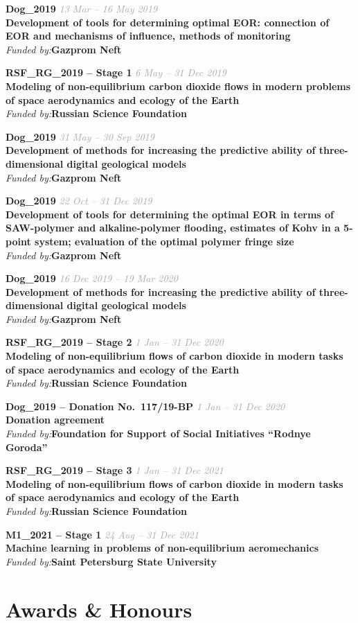 \documentclass[11pt,a4paper]{article}
\newcommand{\grant}[4]{%
  \begin{mdframed}[style=grantbox]
    \noindent
    {\color{headblue}\textbf{#1}}\hfill
    {\small\textcolor{darkgray}{\textit{#3}}}\\[3pt]
    \textbf{#2}\\[2pt]
    {\small\textit{Funded by:}\enspace#4}
  \end{mdframed}
}
\begin{document}
\grant%
  {Dog\_2019}%
  {Development of tools for determining optimal EOR: connection of EOR and mechanisms
   of influence, methods of monitoring}%
  {13 Mar -- 16 May 2019}%
  {\textbf{Gazprom Neft}}
\vspace{-0.1cm}
\grant%
  {RSF\_RG\_2019 -- Stage 1}%
  {Modeling of non-equilibrium carbon dioxide flows in modern problems of space
   aerodynamics and ecology of the Earth}%
  {6 May -- 31 Dec 2019}%
  {\textbf{Russian Science Foundation}}
\vspace{-0.1cm}
\grant%
  {Dog\_2019}%
  {Development of methods for increasing the predictive ability of three-dimensional
   digital geological models}%
  {31 May -- 30 Sep 2019}%
  {\textbf{Gazprom Neft}}
\vspace{-0.1cm}
\grant%
  {Dog\_2019}%
  {Development of tools for determining the optimal EOR in terms of SAW-polymer and
   alkaline-polymer flooding, estimates of Kohv in a 5-point system; evaluation of
   the optimal polymer fringe size}%
  {22 Oct -- 31 Dec 2019}%
  {\textbf{Gazprom Neft}}
\vspace{-0.1cm}
\grant%
  {Dog\_2019}%
  {Development of methods for increasing the predictive ability of three-dimensional
   digital geological models}%
  {16 Dec 2019 -- 19 Mar 2020}%
  {\textbf{Gazprom Neft}}
\vspace{-0.1cm}
\grant%
  {RSF\_RG\_2019 -- Stage 2}%
  {Modeling of non-equilibrium flows of carbon dioxide in modern tasks of space
   aerodynamics and ecology of the Earth}%
  {1 Jan -- 31 Dec 2020}%
  {\textbf{Russian Science Foundation}}
\vspace{-0.1cm}
\grant%
  {Dog\_2019 -- Donation No.\ 117/19-BP}%
  {Donation agreement}%
  {1 Jan -- 31 Dec 2020}%
  {\textbf{Foundation for Support of Social Initiatives ``Rodnye Goroda''}}
\vspace{-0.1cm}
\grant%
  {RSF\_RG\_2019 -- Stage 3}%
  {Modeling of non-equilibrium flows of carbon dioxide in modern tasks of space
   aerodynamics and ecology of the Earth}%
  {1 Jan -- 31 Dec 2021}%
  {\textbf{Russian Science Foundation}}
\vspace{-0.1cm}
\grant%
  {M1\_2021 -- Stage 1}%
  {Machine learning in problems of non-equilibrium aeromechanics}%
  {24 Aug -- 31 Dec 2021}%
  {\textbf{Saint Petersburg State University}}

\section{Awards \& Honours}
\end{document}

